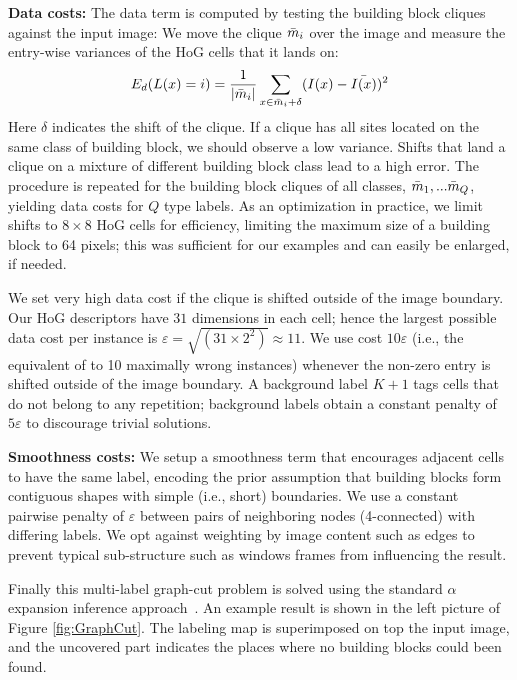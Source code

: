 \documentclass{acmtog}
\begin{document}
\textbf{Data costs:} The data term is computed by testing the building block cliques against the input image: We move the clique $\bar{m}_i$ over the image and measure the entry-wise variances of the HoG cells that it lands on:
%
\begin{equation}
E_{d}(L(x) = i) = \frac{1}{| \bar{m}_i |}\sum_{x \in \bar{m}_i + \delta}(I(x) - \bar{I(x)})^2
\label{eq:gc1data}
\end{equation}
%
Here $\delta$ indicates the shift of the clique. If a clique has all sites located on the same class of building block, we should observe a low variance. Shifts that land a clique on a mixture of different building block class lead to a high error. The procedure is repeated for the building block cliques of all classes, $\bar{m}_1,...\bar{m}_Q$, yielding data costs for $Q$ type labels. As an optimization in practice, we limit shifts to $8 \times 8$ HoG cells for efficiency, limiting the maximum size of a building block to 64 pixels; this was sufficient for our examples and can easily be enlarged, if needed.

We set very high data cost if the clique is shifted outside of the image boundary. Our HoG descriptors have $31$ dimensions in each cell; hence the largest possible data cost per instance is $\varepsilon = \sqrt{(31\times2^2)} \approx 11$. We use cost $10\varepsilon$ (i.e., the equivalent of to 10 maximally wrong instances) whenever the non-zero entry is shifted outside of the image boundary. A background label $K+1$ tags cells that do not belong to any repetition; background labels obtain a constant penalty of $5\varepsilon$ to discourage trivial solutions. 

\textbf{Smoothness costs: } We setup a smoothness term that encourages adjacent cells to have the same label, encoding the prior assumption that building blocks form contiguous shapes with simple (i.e., short) boundaries. We use a constant pairwise penalty of $\varepsilon$ between pairs of neighboring nodes (4-connected) with differing labels. We opt against weighting by image content such as edges to prevent typical sub-structure such as windows frames from influencing the result.

Finally this multi-label graph-cut problem is solved using the standard $\alpha$ expansion inference approach~\cite{BOYKOVpami2001}. An example result is shown in the left picture of Figure \ref{fig:GraphCut}. The labeling map is superimposed on top the input image, and the uncovered part indicates the places where no building blocks could been found.
\end{document}

